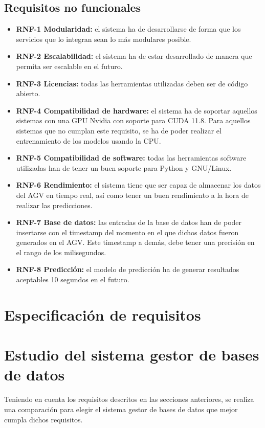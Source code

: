 \subsection{Requisitos no funcionales}
\begin{itemize}
	\item \textbf{RNF-1 Modularidad:} el sistema ha de desarrollarse de forma que los servicios que lo integran sean lo más 
		modulares posible.
	\item \textbf{RNF-2 Escalabilidad:} el sistema ha de estar desarrollado de manera que permita ser escalable en el futuro.
	\item \textbf{RNF-3 Licencias:} todas las herramientas utilizadas deben ser de código abierto.
	\item \textbf{RNF-4 Compatibilidad de hardware:} el sistema ha de soportar aquellos sistemas con una GPU Nvidia con soporte para CUDA
		11.8. Para aquellos sistemas que no cumplan este requisito, se ha de poder realizar el entrenamiento de los modelos
		usando la CPU.
	\item \textbf{RNF-5 Compatibilidad de software:} todas las herramientas software utilizadas han de tener un buen soporte
		para Python y GNU/Linux.
	\item \textbf{RNF-6 Rendimiento:} el sistema tiene que ser capaz de almacenar los datos del AGV en tiempo real, así como
		tener un buen rendimiento a la hora de realizar las predicciones.
	\item \textbf{RNF-7 Base de datos:} las entradas de la base de datos han de poder insertarse con el timestamp del momento
		en el que dichos datos fueron generados en el AGV. Este timestamp a demás, debe tener una precisión en el rango de
		los milisegundos.
	\item \textbf{RNF-8 Predicción:} el modelo de predicción ha de generar resultados aceptables 10 segundos en el futuro.
\end{itemize}

\section{Especificación de requisitos}


\section{Estudio del sistema gestor de bases de datos}

Teniendo en cuenta los requisitos descritos en las secciones anteriores, se realiza una comparación para elegir el sistema 
gestor de bases de datos que mejor cumpla dichos requisitos.

